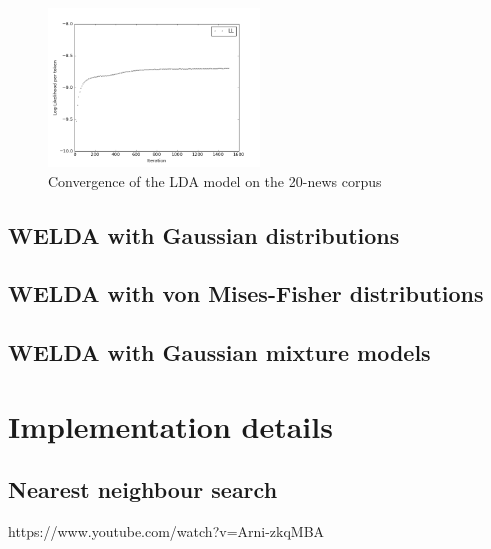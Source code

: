 \documentclass[
        a4paper,
        titlepage,
        twoside,
        parskip
        ]{scrbook}
\theoremstyle{break}
\begin{document}
\begin{itemize}
    \begin{figure}
           \centering
           \includegraphics[width=0.5\textwidth]{figures/ll_lda_convergence.png}
           \caption{Convergence of the LDA model on the 20-news corpus}
           \label{fig:ll_lda_convergence}
    \end{figure}
\end{itemize}


\subsection{WELDA with Gaussian distributions}
\subsection{WELDA with von Mises-Fisher distributions}
\subsection{WELDA with Gaussian mixture models}




\section{Implementation details}
\subsection{Nearest neighbour search}
https://www.youtube.com/watch?v=Arni-zkqMBA
\end{document}
